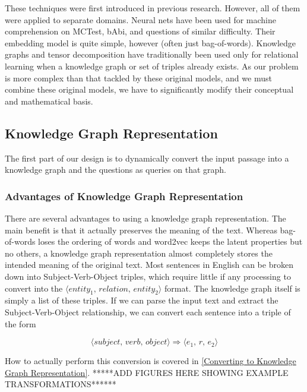 \documentclass[pageno]{jpaper}
\begin{document}
These techniques were first introduced in previous research. However, all of
them were applied to separate domains. Neural nets have been used for machine
comprehension on MCTest, bAbi, and questions of similar difficulty. Their
embedding model is quite simple, however (often just bag-of-words). Knowledge
graphs and tensor decomposition have traditionally been used only for relational
learning when a knowledge graph or set of triples already exists. As our problem
is more complex than that tackled by these original models, and we must combine
these original models, we have to significantly modify their conceptual and
mathematical basis.

\subsection{Knowledge Graph Representation}
\label{Knowledge Graph Representation}

The first part of our design is to dynamically convert the input passage into a
knowledge graph and the questions as queries on that graph. \\

\subsubsection{Advantages of Knowledge Graph Representation}
\label{Advantages of Knowledge Graph Representation}

There are several advantages to using a knowledge graph representation. The main
benefit is that it actually preserves the meaning of the text. Whereas
bag-of-words loses the ordering of words and word2vec keeps the latent
properties but no others, a knowledge graph representation almost completely
stores the intended meaning of the original text. Most sentences in English can
be broken down into Subject-Verb-Object triples, which require little if any
processing to convert into the $\langle \textit{entity}_1, \, \textit{relation}, \,
\textit{entity}_2 \rangle$ format. The knowledge graph itself is simply a list of
these triples. If we can parse the input text and extract the
Subject-Verb-Object relationship, we can convert each sentence into a triple of
the form

$$\langle \textit{subject}, \, \textit{verb}, \, \textit{object} \rangle
\Rightarrow \langle e_1, \, r, \, e_2 \rangle$$

How to actually perform this conversion is covered in \ref{Converting to
Knowledge Graph Representation}. *****ADD FIGURES HERE SHOWING EXAMPLE TRANSFORMATIONS******
\end{document}
